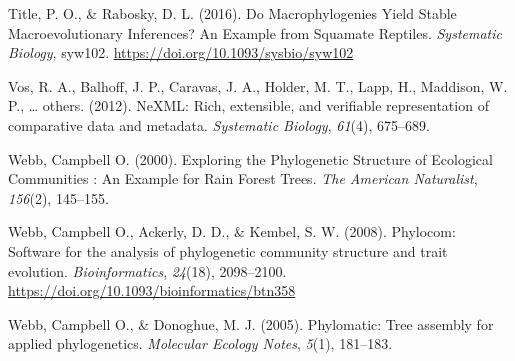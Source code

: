 \documentclass[
  english,
  man]{apa6}
\newlength{\cslhangindent}
\newlength{\cslentryspacingunit} %
\newenvironment{CSLReferences}[2] %
 {%
  \setlength{\parindent}{0pt}
  \ifodd #1
  \let\oldpar\par
  \def\par{\hangindent=\cslhangindent\oldpar}
  \fi
  \setlength{\parskip}{#2\cslentryspacingunit}
 }%
 {}
\begin{document}
\begin{CSLReferences}{1}{0}
\leavevmode{}%
Title, P. O., \& Rabosky, D. L. (2016). {Do Macrophylogenies Yield Stable Macroevolutionary Inferences? An Example from Squamate Reptiles}. \emph{Systematic Biology}, syw102. \url{https://doi.org/10.1093/sysbio/syw102}

\leavevmode{}%
Vos, R. A., Balhoff, J. P., Caravas, J. A., Holder, M. T., Lapp, H., Maddison, W. P., \ldots{} others. (2012). NeXML: Rich, extensible, and verifiable representation of comparative data and metadata. \emph{Systematic Biology}, \emph{61}(4), 675--689.

\leavevmode{}%
Webb, Campbell O. (2000). {Exploring the Phylogenetic Structure of Ecological Communities : An Example for Rain Forest Trees}. \emph{The American Naturalist}, \emph{156}(2), 145--155.

\leavevmode{}%
Webb, Campbell O., Ackerly, D. D., \& Kembel, S. W. (2008). {Phylocom: Software for the analysis of phylogenetic community structure and trait evolution}. \emph{Bioinformatics}, \emph{24}(18), 2098--2100. \url{https://doi.org/10.1093/bioinformatics/btn358}

\leavevmode{}%
Webb, Campbell O., \& Donoghue, M. J. (2005). Phylomatic: Tree assembly for applied phylogenetics. \emph{Molecular Ecology Notes}, \emph{5}(1), 181--183.

\end{CSLReferences}

\endgroup


\end{document}
